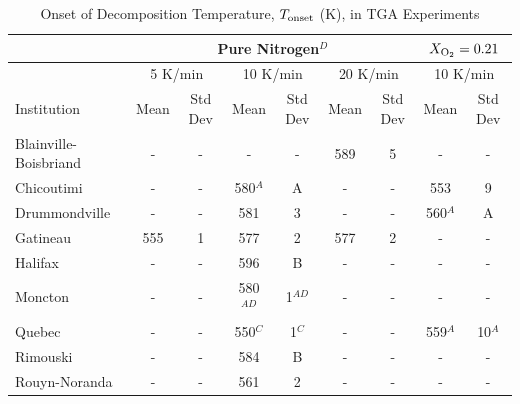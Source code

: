 \documentclass{book}
\begin{document}
\begin{table}[ht]
\caption{Onset of Decomposition Temperature, $T_{\rm onset}$ (K), in TGA Experiments}
\label{Table_10}
\begin{center}
\begin{tabular}{|l|cc|cc|cc|cc|}
\hline
                        & \multicolumn{6}{|c|}{Pure Nitrogen$^D$} & \multicolumn{2}{|c|}{$X_{\rm O_2}=0.21$}                                                       \\  \hline
                        & \multicolumn{2}{|c|}{5 K/min} & \multicolumn{2}{|c|}{10 K/min}    & \multicolumn{2}{|c|}{20 K/min} & \multicolumn{2}{|c|}{10 K/min}      \\  \hline
Institution             & Mean        & Std Dev         & Mean           & Std Dev          & Mean       & Std Dev           & Mean        & Std Dev               \\  \hline
Blainville-Boisbriand   & -           & -               & -              & -                & 589        & 5                 & -           & -                     \\
Chicoutimi              & -           & -               & 580$^A$        & A                & -          & -                 & 553         & 9                     \\
Drummondville           & -           & -               & 581            & 3                & -          & -                 & 560$^A$     & A                     \\
Gatineau                & 555         & 1               & 577            & 2                & 577        & 2                 & -           & -                     \\
Halifax                 & -           & -               & 596            & B                & -          & -                 & -           & -                     \\
Moncton                 & -           & -               & 580$^{AD}$     & 1$^{AD}$         & -          & -                 & -           & -                     \\
Quebec                  & -           & -               & 550$^C$        & 1$^C$            & -          & -                 & 559$^A$     & 10$^A$                \\
Rimouski                & -           & -               & 584            & B                & -          & -                 & -           & -                     \\
Rouyn-Noranda           & -           & -               & 561            & 2                & -          & -                 & -           & -                     \\

\end{tabular}
\end{center}
\end{table}
\end{document}
